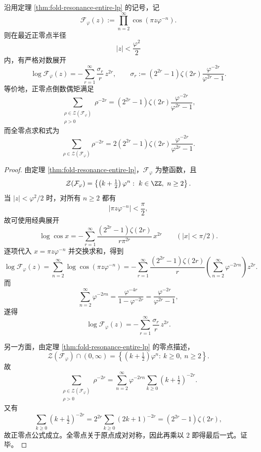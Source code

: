 \begin{theorem}\label{thm:xi-time-part71-resonance-entire-log-taylor-zero-moments}
沿用定理 \ref{thm:fold-resonance-entire-lp} 的记号，记
\[
\mathcal F_\varphi(z):=\prod_{n=2}^{\infty}\cos(\pi z\varphi^{-n}).
\]
则在最近正零点半径
\[
|z|<\frac{\varphi^2}{2}
\]
内，有严格对数展开
\[
\log \mathcal F_\varphi(z)
=
-\sum_{r=1}^{\infty}\frac{\sigma_r}{r}\,z^{2r},
\qquad
\sigma_r:=
(2^{2r}-1)\zeta(2r)\frac{\varphi^{-2r}}{\varphi^{2r}-1}.
\]
等价地，正零点倒数偶矩满足
\[
\sum_{\substack{\rho\in\mathcal Z(\mathcal F_\varphi)\\ \rho>0}}\rho^{-2r}
=
(2^{2r}-1)\zeta(2r)\frac{\varphi^{-2r}}{\varphi^{2r}-1},
\]
而全零点求和式为
\[
\sum_{\rho\in\mathcal Z(\mathcal F_\varphi)}\rho^{-2r}
=
2(2^{2r}-1)\zeta(2r)\frac{\varphi^{-2r}}{\varphi^{2r}-1}.
\]
\end{theorem}
\begin{proof}
由定理 \ref{thm:fold-resonance-entire-lp}，\(\mathcal F_\varphi\) 为整函数，且
\[
\mathcal Z(\mathcal F_\varphi)
=
\left\{
\left(k+\tfrac12\right)\varphi^n:\ k\in\ZZ,\ n\ge 2
\right\}.
\]
当 \(|z|<\varphi^2/2\) 时，对所有 \(n\ge 2\) 都有
\[
|\pi z\varphi^{-n}|<\frac{\pi}{2},
\]
故可使用经典展开
\[
\log\cos x
=
-\sum_{r=1}^{\infty}\frac{(2^{2r}-1)\zeta(2r)}{r\pi^{2r}}\,x^{2r}
\qquad
(|x|<\pi/2).
\]
逐项代入 \(x=\pi z\varphi^{-n}\) 并交换求和，得到
\[
\log \mathcal F_\varphi(z)
=
\sum_{n=2}^{\infty}\log\cos(\pi z\varphi^{-n})
=
-\sum_{r=1}^{\infty}\frac{(2^{2r}-1)\zeta(2r)}{r}
\left(
\sum_{n=2}^{\infty}\varphi^{-2rn}
\right)z^{2r}.
\]
而
\[
\sum_{n=2}^{\infty}\varphi^{-2rn}
=
\frac{\varphi^{-4r}}{1-\varphi^{-2r}}
=
\frac{\varphi^{-2r}}{\varphi^{2r}-1},
\]
遂得
\[
\log \mathcal F_\varphi(z)
=
-\sum_{r=1}^{\infty}\frac{\sigma_r}{r}\,z^{2r}.
\]

另一方面，由定理 \ref{thm:fold-resonance-entire-lp} 的零点描述，
\[
\mathcal Z(\mathcal F_\varphi)\cap (0,\infty)
=
\left\{
\left(k+\tfrac12\right)\varphi^n:\ k\ge 0,\ n\ge 2
\right\}.
\]
故
\[
\sum_{\substack{\rho\in\mathcal Z(\mathcal F_\varphi)\\ \rho>0}}\rho^{-2r}
=
\sum_{n=2}^{\infty}\varphi^{-2rn}\sum_{k\ge 0}\left(k+\tfrac12\right)^{-2r}.
\]
又有
\[
\sum_{k\ge 0}\left(k+\tfrac12\right)^{-2r}
=
2^{2r}\sum_{k\ge 0}(2k+1)^{-2r}
=
(2^{2r}-1)\zeta(2r),
\]
故正零点公式成立。全零点关于原点成对对称，因此再乘以 \(2\) 即得最后一式。证毕。
\end{proof}

